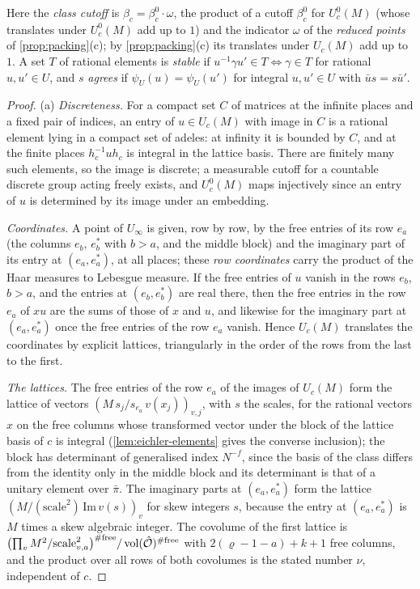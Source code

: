 Here the \emph{class cutoff} is $\beta_c=\beta^0_c\cdot\omega$, the product of a cutoff $\beta^0_c$ for $U^0_c(M)$ (whose translates under $U^0_c(M)$ add up to $1$) and the indicator $\omega$ of the \emph{reduced points} of \cref{prop:packing}(c); by
\cref{prop:packing}(c) its translates under $U_c(M)$ add up to $1$. A set $T$ of rational elements is \emph{stable} if $u^{-1}\gamma u'\in T\iff\gamma\in T$ for rational $u,u'\in U$, and $s$ \emph{agrees} if $\psi_U(u)=\psi_U(u')$ for integral $u,u'\in U$ with $\bar us=s\bar u'$.

\begin{proof}
(a) \emph{Discreteness.} For a compact set $C$ of matrices at the infinite places and a fixed pair of indices, an entry of $u\in U_c(M)$ with image in $C$ is a rational element lying in a compact set of adeles: at infinity it is bounded by $C$, and at the finite places
$h_c^{-1}uh_c$ is integral in the lattice basis. There are finitely many such elements, so the image is discrete; a measurable cutoff for a countable discrete group acting freely exists, and $U^0_c(M)$ maps injectively since an entry of $u$ is
determined by its image under an embedding.

\emph{Coordinates.} A point of $U_\infty$ is given, row by row, by the free entries of its row $e_a$ (the columns $e_b$, $e^*_b$ with $b>a$, and the middle block) and the imaginary part of its entry at $(e_a,e^*_a)$, at all places; these
\emph{row coordinates} carry the product of the Haar measures to Lebesgue measure. If the free entries of $u$ vanish in the rows $e_b$, $b>a$, and the entries at $(e_b,e^*_b)$ are real there, then the free entries in the row $e_a$ of $xu$ are the sums of those of
$x$ and $u$, and likewise for the imaginary part at $(e_a,e^*_a)$ once the free entries of the row $e_a$ vanish. Hence $U_c(M)$ translates the coordinates by explicit lattices, triangularly in the order of the rows from the last to the first.

\emph{The lattices.} The free entries of the row $e_a$ of the images of $U_c(M)$ form the lattice of vectors $(M\,s_j/s_{e_a}\,v(x_j))_{v,j}$, with $s$ the scales, for the rational vectors $x$ on the free columns whose transformed vector under the
block of the lattice basis of $c$ is integral (\cref{lem:eichler-elements} gives the converse inclusion); the block has determinant of generalised index $N^{-f}$, since the basis of the class differs from the identity only in the middle
block and its determinant is that of a unitary element over $\bar\pi$. The imaginary parts at $(e_a,e^*_a)$ form the lattice $(M/(\text{scale}^2)\,\mathrm{Im}\,v(s))_v$ for skew integers $s$, because the entry at $(e_a,e^*_a)$ is $M$ times a skew algebraic integer.
The covolume of the first lattice is $\bigl(\prod_vM^2/\text{scale}_{v,a}^2\bigr)^{\#\text{free}}/\operatorname{vol}(\hat{\mathcal{O}})^{\#\text{free}}$ with $2(\varrho-1-a)+k+1$ free columns, and the product over all rows of both covolumes is the stated number $\nu$, independent of $c$.


\end{proof}
